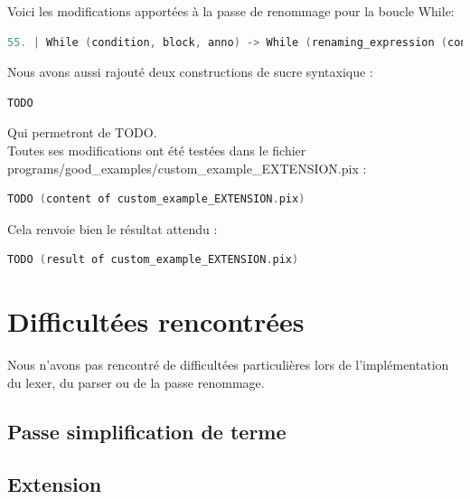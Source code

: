 \documentclass{report}
\begin{document}
    Voici les modifications apportées à la passe de renommage pour la boucle While: \\

    \begin{lstlisting}[language=C, basicstyle=\ttfamily]
        55. | While (condition, block, anno) -> While (renaming_expression (condition, counter_env), renaming_statement (block, Environment.copy counter_env), anno)
    \end{lstlisting}

    Nous avons aussi rajouté deux constructions de sucre syntaxique :\\

    \begin{lstlisting}[language=C, basicstyle=\ttfamily]
        TODO
    \end{lstlisting}

    Qui permetront de TODO.\\

    Toutes ses modifications ont été testées dans le fichier programs/good_examples/custom_example_EXTENSION.pix :\\

    \begin{lstlisting}[language=C, basicstyle=\ttfamily]
        TODO (content of custom_example_EXTENSION.pix)
    \end{lstlisting}

    Cela renvoie bien le résultat attendu : \\

    \begin{lstlisting}[language=C, basicstyle=\ttfamily]
        TODO (result of custom_example_EXTENSION.pix)
    \end{lstlisting}

    \newpage

\chapter{Difficultées rencontrées}

   \quad Nous n'avons pas rencontré de difficultées particulières lors de l'implémentation du lexer, du parser ou de la passe renommage.\\

    \section{Passe simplification de terme}

    \section{Extension}
\end{document}
